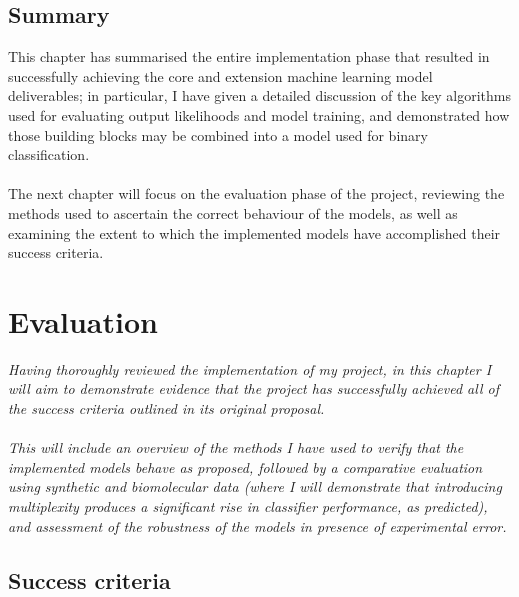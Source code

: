 \documentclass[12pt,a4paper,twoside,openright]{report}
\begin{document}
\section{Summary}

This chapter has summarised the entire implementation phase that resulted in successfully achieving the core and extension machine learning model deliverables; in particular, I have given a detailed discussion of the key algorithms used for evaluating output likelihoods and model training, and demonstrated how those building blocks may be combined into a model used for binary classification.\\ \\
The next chapter will focus on the evaluation phase of the project, reviewing the methods used to ascertain the correct behaviour of the models, as well as examining the extent to which the implemented models have accomplished their success criteria.

\chapter{Evaluation}

\emph{Having thoroughly reviewed the implementation of my project, in this chapter I will aim to demonstrate evidence that the project has successfully achieved all of the success criteria outlined in its original proposal.\\ \\
This will include an overview of the methods I have used to verify that the implemented models behave as proposed, followed by a comparative evaluation using synthetic and biomolecular data (where I will demonstrate that introducing multiplexity produces a  significant rise in classifier performance, as predicted), and assessment of the robustness of the models in presence of experimental error.}

\section{Success criteria}
\end{document}
